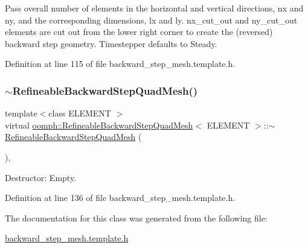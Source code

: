 Pass overall number of elements in the horizontal and vertical directions, nx and ny, and the corresponding dimensions, lx and ly. nx\+\_\+cut\+\_\+out and ny\+\_\+cut\+\_\+out elements are cut out from the lower right corner to create the (reversed) backward step geometry. Timestepper defaults to Steady. 



Definition at line 115 of file backward\+\_\+step\+\_\+mesh.\+template.\+h.

\mbox{\label{classoomph_1_1RefineableBackwardStepQuadMesh_af30cb7d5ef893e64b184d540ed415e11}} 
\subsubsection{\texorpdfstring{$\sim$\+Refineable\+Backward\+Step\+Quad\+Mesh()}{~RefineableBackwardStepQuadMesh()}}
{\footnotesize\ttfamily template$<$class E\+L\+E\+M\+E\+NT $>$ \\
virtual \hyperlink{classoomph_1_1RefineableBackwardStepQuadMesh}{oomph\+::\+Refineable\+Backward\+Step\+Quad\+Mesh}$<$ E\+L\+E\+M\+E\+NT $>$\+::$\sim$\hyperlink{classoomph_1_1RefineableBackwardStepQuadMesh}{Refineable\+Backward\+Step\+Quad\+Mesh} (\begin{DoxyParamCaption}{ }\end{DoxyParamCaption})\hspace{0.3cm}{\ttfamily [inline]}, {\ttfamily [virtual]}}



Destructor\+: Empty. 



Definition at line 136 of file backward\+\_\+step\+\_\+mesh.\+template.\+h.



The documentation for this class was generated from the following file\+:\begin{DoxyCompactItemize}
\item 
\hyperlink{backward__step__mesh_8template_8h}{backward\+\_\+step\+\_\+mesh.\+template.\+h}\end{DoxyCompactItemize}
